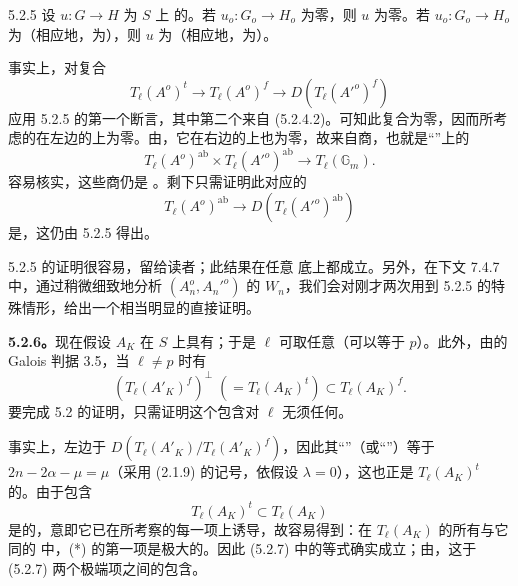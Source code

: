 \begin{SGAresult}{}{5.2.5}
设 $u:G\to H$ 为 $S$ 上 的。若 $u_o:G_o\to H_o$ 为零，则 $u$ 为零。若 $u_o:G_o\to H_o$ 为（相应地，为），则 $u$ 为（相应地，为）。
\end{SGAresult}
事实上，对复合
\[
T_\ell(A^o)^t\longrightarrow T_\ell(A^o)^f\longrightarrow D(T_\ell(A'^o)^f)
\]
应用 5.2.5 的第一个断言，其中第二个来自 (5.2.4.2)。可知此复合为零，因而所考虑的在左边的上为零。由，它在右边的上也为零，故来自商，也就是“”上的
\[
T_\ell(A^o)^{\mathrm{ab}}\times T_\ell(A'^o)^{\mathrm{ab}}\longrightarrow T_\ell(\mathbb G_m).
\]
容易核实，这些商仍是 。剩下只需证明此对应的
\[
T_\ell(A^o)^{\mathrm{ab}}\longrightarrow D(T_\ell(A'^o)^{\mathrm{ab}})
\]
是，这仍由 5.2.5 得出。

5.2.5 的证明很容易，留给读者；此结果在任意 底上都成立。另外，在下文 7.4.7 中，通过稍微细致地分析 $(A_n^o,A_n'^o)$ 的 $W_n$，我们会对刚才两次用到 5.2.5 的特殊情形，给出一个相当明显的直接证明。

\textbf{5.2.6。}现在假设 $A_K$ 在 $S$ 上具有；于是 $\ell$ 可取任意（可以等于 $p$）。此外，由的 Galois 判据 3.5，当 $\ell\ne p$ 时有
\[
(T_\ell(A'_K)^f)^\perp\;(=T_\ell(A_K)^t)\subset T_\ell(A_K)^f.\tag{5.2.7}
\]
要完成 5.2 的证明，只需证明这个包含对 $\ell$ 无须任何。

事实上，左边于 $D(T_\ell(A'_K)/T_\ell(A'_K)^f)$，因此其“”（或“”）等于 $2n-2\alpha-\mu=\mu$（采用 (2.1.9) 的记号，依假设 $\lambda=0$），这也正是 $T_\ell(A_K)^t$ 的。由于包含
\[
T_\ell(A_K)^t\subset T_\ell(A_K)\tag{*}
\]
是的，意即它已在所考察的每一项上诱导，故容易得到：在 $T_\ell(A_K)$ 的所有与它同的 中，(*) 的第一项是极大的。因此 (5.2.7) 中的等式确实成立；由，这于 (5.2.7) 两个极端项之间的包含。

